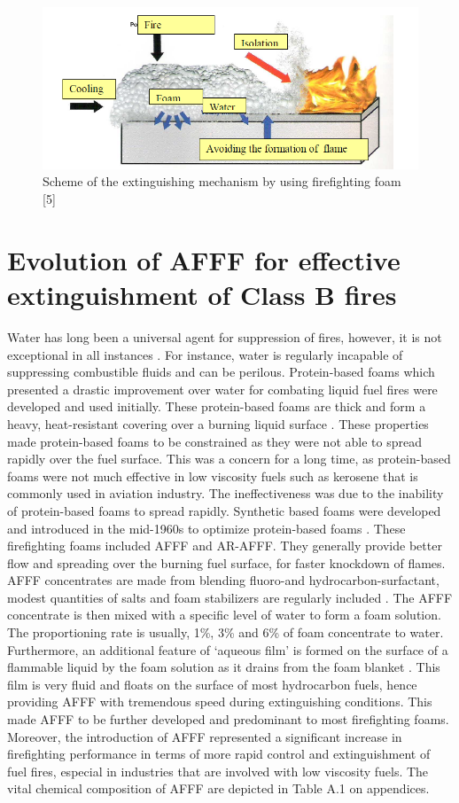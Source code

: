 \documentclass[12pt]{report}
\begin{document}
\begin{figure}[H]
    \centering
    \includegraphics[width=.8\textwidth]{extinguishing_mechanism_scheme.png}
    \caption{Scheme of the extinguishing mechanism by using firefighting foam [5]}
    \label{ch2:figure:scheme}
\end{figure}

\section{Evolution of AFFF for effective extinguishment of Class B fires}
Water has long been a universal agent for suppression of fires, however, it is not exceptional in all instances \cite{hinnant2020characterizing}. For instance, water is regularly incapable of suppressing combustible fluids and can be perilous. Protein-based foams which presented a drastic improvement over water for combating liquid fuel fires were developed and used initially. These protein-based foams are thick and form a heavy, heat-resistant covering over a burning liquid surface \cite{scheffey1995evaluating}. These properties made protein-based foams to be constrained as they were not able to spread rapidly over the fuel surface. This was a concern for a long time, as protein-based foams were not much effective in low viscosity fuels such as kerosene that is commonly used in aviation industry. The ineffectiveness was due to the inability of protein-based foams to spread rapidly.
Synthetic based foams were developed and introduced in the mid-1960s to optimize protein-based foams \cite{aamodt2020review} . These firefighting foams included AFFF and AR-AFFF. They generally provide better flow and spreading over the burning fuel surface, for faster knockdown of flames. AFFF concentrates are made from blending fluoro-and hydrocarbon-surfactant, modest quantities of salts and foam stabilizers are regularly included \cite{wang2019research}. The AFFF concentrate is then mixed with a specific level of water to form a foam solution. The proportioning rate is usually, 1\%, 3\% and 6\% of foam concentrate to water. Furthermore, an additional feature of ‘aqueous film’ is formed on the surface of a flammable liquid by the foam solution as it drains from the foam blanket \cite{hinnant2020characterizing}. This film is very fluid and floats on the surface of most hydrocarbon fuels, hence providing AFFF with tremendous speed during extinguishing conditions. This made AFFF to be further developed and predominant to most firefighting foams. Moreover, the introduction of AFFF represented a significant increase in firefighting performance in terms of more rapid control and extinguishment of fuel fires, especial in industries that are involved with low viscosity fuels. The vital chemical composition of AFFF are depicted in Table A.1 on appendices.
\end{document}

